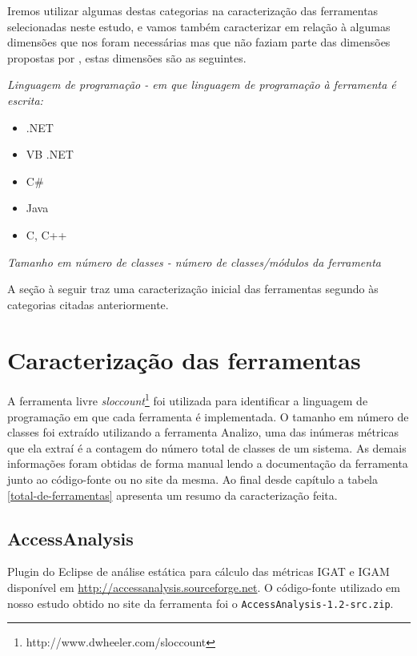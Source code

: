 Iremos utilizar algumas destas categorias na caracterização das ferramentas
selecionadas neste estudo, e vamos também caracterizar em relação à algumas dimensões que nos
foram necessárias mas que não faziam parte das dimensões propostas por ,
estas dimensões são as seguintes.

\begin{description}

  \item {\it Linguagem de programação - em que linguagem de programação à ferramenta é escrita:}
    \begin{itemize}
      \item .NET
      \item VB .NET
      \item C\#
      \item Java
      \item C, C++
    \end{itemize}

  \item {\it Tamanho em número de classes - número de classes/módulos da ferramenta}

\end{description}

A seção à seguir traz uma caracterização inicial das ferramentas segundo às
categorias citadas anteriormente.

\section{Caracterização das ferramentas} \label{caracterizacao-das-ferramentas}

A ferramenta livre {\it sloccount}\footnote{http://www.dwheeler.com/sloccount}
foi utilizada para identificar a linguagem de programação em que cada
ferramenta é implementada. O tamanho em número de classes foi extraído utilizando a ferramenta
Analizo, uma das inúmeras métricas que ela extraí é a contagem do número total
de classes de um sistema. As demais informações foram obtidas de forma manual
lendo a documentação da ferramenta junto ao código-fonte ou no site da mesma.
Ao final desde capítulo a tabela \ref{total-de-ferramentas} apresenta um resumo
da caracterização feita.

\subsection{AccessAnalysis}

Plugin do Eclipse de análise estática 
para cálculo das métricas IGAT e IGAM
disponível em \url{http://accessanalysis.sourceforge.net}. O código-fonte
utilizado em nosso estudo obtido no site da ferramenta foi o
\texttt{AccessAnalysis-1.2-src.zip}.

